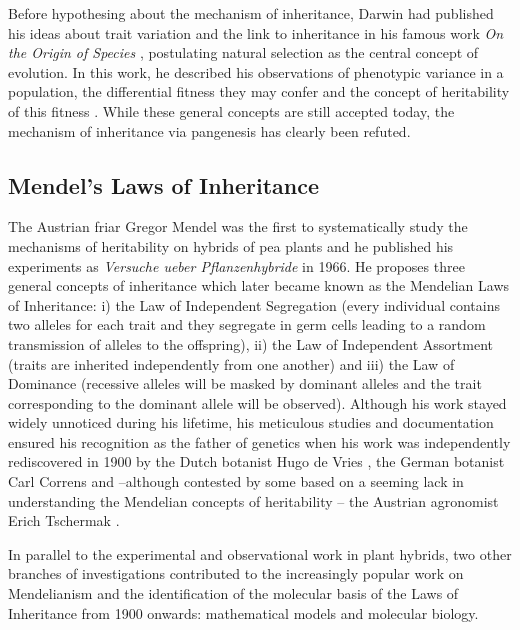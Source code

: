 Before hypothesing about the mechanism of inheritance, Darwin had published his ideas about trait variation and the link to inheritance in his famous work \textit{On the Origin of Species} \citep{Darwin1859}, postulating natural selection as the central concept of evolution. In this work, he described his observations of phenotypic variance in a population, the differential fitness they may confer and the concept of heritability of this fitness \citep{Lewontin1970}. While these general concepts are still accepted today, the mechanism of inheritance via pangenesis has clearly been refuted. 

\subsection{Mendel's Laws of Inheritance}
The Austrian friar Gregor Mendel was the first to systematically study the mechanisms of heritability on hybrids of pea plants and he published his experiments as \textit{Versuche ueber Pflanzenhybride} in 1966. He proposes three general concepts of inheritance which later became known as the Mendelian Laws of Inheritance: i) the Law of Independent Segregation (every individual contains two alleles for each trait and they segregate in germ cells leading to a random transmission of alleles to the offspring), ii) the Law of Independent Assortment (traits are inherited independently from one another) and iii) the Law of Dominance (recessive alleles will be masked by dominant alleles and the trait corresponding to the dominant allele will be observed). Although his work stayed widely unnoticed during his lifetime, his meticulous studies and documentation ensured his recognition as the father of genetics when his work was independently rediscovered in 1900 by the Dutch  botanist Hugo de Vries \citep{deVries1900,Hannah1950}, the German botanist Carl Correns \citep{Correns1900,Pierncik1950} and --although contested by some based on a seeming lack in understanding the Mendelian concepts of heritability \citep{Monaghan1986,Floyd1987}-- the Austrian agronomist Erich Tschermak \citet{Tschermak1900}. 

In parallel to the experimental and observational work in plant hybrids, two other branches of investigations contributed to the increasingly popular work on Mendelianism and the identification of the molecular basis of the Laws of Inheritance from 1900 onwards: mathematical models and molecular biology. 

